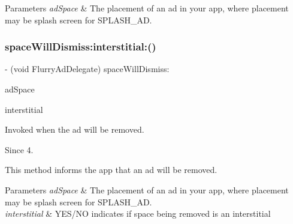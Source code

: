 \begin{DoxyParams}{Parameters}
{\em ad\+Space} & The placement of an ad in your app, where placement may be splash screen for S\+P\+L\+A\+S\+H\+\_\+\+AD. \\
\hline
\end{DoxyParams}
\mbox{\label{protocolFlurryAdDelegate_01-p_a4e39fac0521e2e56e095d29f04f173c3}} 
\subsubsection{\texorpdfstring{space\+Will\+Dismiss\+:interstitial\+:()}{spaceWillDismiss:interstitial:()}}
{\footnotesize\ttfamily -\/ (void Flurry\+Ad\+Delegate) space\+Will\+Dismiss\+: \begin{DoxyParamCaption}\item[{(N\+S\+String $\ast$)}]{ad\+Space }\item[{interstitial:(B\+O\+OL)}]{interstitial }\end{DoxyParamCaption}\hspace{0.3cm}{\ttfamily [optional]}}



Invoked when the ad will be removed. 

\begin{DoxySince}{Since}
4.
\end{DoxySince}
This method informs the app that an ad will be removed.


\begin{DoxyParams}{Parameters}
{\em ad\+Space} & The placement of an ad in your app, where placement may be splash screen for S\+P\+L\+A\+S\+H\+\_\+\+AD. \\
\hline
{\em interstitial} & Y\+E\+S/\+NO indicates if space being removed is an interstitial \\
\hline
\end{DoxyParams}
\mbox{\label{protocolFlurryAdDelegate_01-p_ad1c9f8b7c7d8ba096be69f48a2b87fd5}} 
